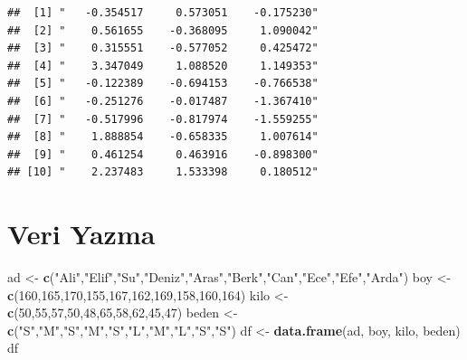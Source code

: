 \documentclass[
  oneside]{book}
\newenvironment{Shaded}{\begin{snugshade}}{\end{snugshade}}
\newcommand{\DecValTok}[1]{\textcolor[rgb]{0.00,0.00,0.81}{#1}}
\newcommand{\FunctionTok}[1]{\textcolor[rgb]{0.13,0.29,0.53}{\textbf{#1}}}
\newcommand{\NormalTok}[1]{#1}
\newcommand{\OtherTok}[1]{\textcolor[rgb]{0.56,0.35,0.01}{#1}}
\newcommand{\StringTok}[1]{\textcolor[rgb]{0.31,0.60,0.02}{#1}}
\begin{document}
\begin{verbatim}
##  [1] "   -0.354517     0.573051    -0.175230"
##  [2] "    0.561655    -0.368095     1.090042"
##  [3] "    0.315551    -0.577052     0.425472"
##  [4] "    3.347049     1.088520     1.149353"
##  [5] "   -0.122389    -0.694153    -0.766538"
##  [6] "   -0.251276    -0.017487    -1.367410"
##  [7] "   -0.517996    -0.817974    -1.559255"
##  [8] "    1.888854    -0.658335     1.007614"
##  [9] "    0.461254     0.463916    -0.898300"
## [10] "    2.237483     1.533398     0.180512"
\end{verbatim}

\hypertarget{veri-yazma}{%
\section{Veri Yazma}\label{veri-yazma}}

\begin{Shaded}
\begin{Highlighting}[]
\NormalTok{ad  }\OtherTok{\textless{}{-}}  \FunctionTok{c}\NormalTok{(}\StringTok{"Ali"}\NormalTok{,}\StringTok{"Elif"}\NormalTok{,}\StringTok{"Su"}\NormalTok{,}\StringTok{"Deniz"}\NormalTok{,}\StringTok{"Aras"}\NormalTok{,}\StringTok{"Berk"}\NormalTok{,}\StringTok{"Can"}\NormalTok{,}\StringTok{"Ece"}\NormalTok{,}\StringTok{"Efe"}\NormalTok{,}\StringTok{"Arda"}\NormalTok{)}
\NormalTok{boy }\OtherTok{\textless{}{-}} \FunctionTok{c}\NormalTok{(}\DecValTok{160}\NormalTok{,}\DecValTok{165}\NormalTok{,}\DecValTok{170}\NormalTok{,}\DecValTok{155}\NormalTok{,}\DecValTok{167}\NormalTok{,}\DecValTok{162}\NormalTok{,}\DecValTok{169}\NormalTok{,}\DecValTok{158}\NormalTok{,}\DecValTok{160}\NormalTok{,}\DecValTok{164}\NormalTok{)}
\NormalTok{kilo }\OtherTok{\textless{}{-}} \FunctionTok{c}\NormalTok{(}\DecValTok{50}\NormalTok{,}\DecValTok{55}\NormalTok{,}\DecValTok{57}\NormalTok{,}\DecValTok{50}\NormalTok{,}\DecValTok{48}\NormalTok{,}\DecValTok{65}\NormalTok{,}\DecValTok{58}\NormalTok{,}\DecValTok{62}\NormalTok{,}\DecValTok{45}\NormalTok{,}\DecValTok{47}\NormalTok{)}
\NormalTok{beden }\OtherTok{\textless{}{-}} \FunctionTok{c}\NormalTok{(}\StringTok{"S"}\NormalTok{,}\StringTok{"M"}\NormalTok{,}\StringTok{"S"}\NormalTok{,}\StringTok{"M"}\NormalTok{,}\StringTok{"S"}\NormalTok{,}\StringTok{"L"}\NormalTok{,}\StringTok{"M"}\NormalTok{,}\StringTok{"L"}\NormalTok{,}\StringTok{"S"}\NormalTok{,}\StringTok{"S"}\NormalTok{)}
\NormalTok{df }\OtherTok{\textless{}{-}} \FunctionTok{data.frame}\NormalTok{(ad, boy, kilo, beden)}
\NormalTok{df}
\end{Highlighting}
\end{Shaded}
\end{document}

